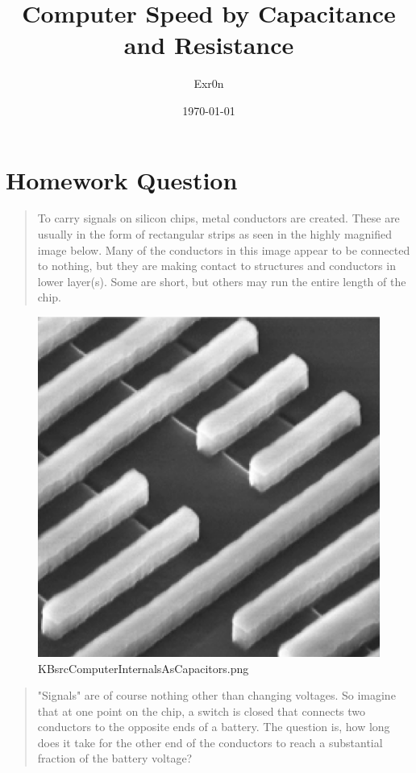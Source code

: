 \documentclass[letterpaper]{article}
\author{Exr0n}
\date{\today}
\title{Computer Speed by Capacitance and Resistance}
\renewcommand{\tableofcontents}{}
\begin{document}
\tableofcontents



\section{Homework Question}
\label{sec:orgf6495f4}
\begin{quote}
To carry signals on silicon chips, metal conductors are created. These
are usually in the form of rectangular strips as seen in the highly
magnified image below. Many of the conductors in this image appear to
be connected to nothing, but they are making contact to structures and
conductors in lower layer(s). Some are short, but others may run the
entire length of the chip.
\end{quote}

\begin{figure}[htbp]
\centering
\includegraphics[width=.9\linewidth]{KBsrcComputerInternalsAsCapacitors.png}
\caption{KBsrcComputerInternalsAsCapacitors.png}
\end{figure}

\begin{quote}
"Signals" are of course nothing other than changing voltages. So
imagine that at one point on the chip, a switch is closed that
connects two conductors to the opposite ends of a battery. The
question is, how long does it take for the other end of the conductors
to reach a substantial fraction of the battery voltage?
\end{quote}
\end{document}
